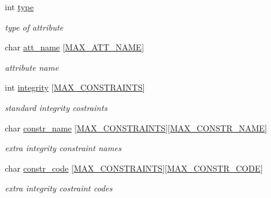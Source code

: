 \begin{DoxyCompactItemize}
\item 
\mbox{\label{structAK__header_a88b9d916b6efa4ba9408ead73ad5bd02}} 
int \hyperlink{structAK__header_a88b9d916b6efa4ba9408ead73ad5bd02}{type}
\begin{DoxyCompactList}\small\item\em type of attribute \end{DoxyCompactList}\item 
\mbox{\label{structAK__header_aa0d9f18802106957caa6661e4661d0d5}} 
char \hyperlink{structAK__header_aa0d9f18802106957caa6661e4661d0d5}{att\+\_\+name} \mbox{[}\hyperlink{constants_8h_ad221251e45ce1d6bfb3eff3b142c0fcd}{M\+A\+X\+\_\+\+A\+T\+T\+\_\+\+N\+A\+ME}\mbox{]}
\begin{DoxyCompactList}\small\item\em attribute name \end{DoxyCompactList}\item 
\mbox{\label{structAK__header_a1a420a74bf00556e0258e963e5021e28}} 
int \hyperlink{structAK__header_a1a420a74bf00556e0258e963e5021e28}{integrity} \mbox{[}\hyperlink{constants_8h_aab6cc9020398cab07c4ee0ebef5349c9}{M\+A\+X\+\_\+\+C\+O\+N\+S\+T\+R\+A\+I\+N\+TS}\mbox{]}
\begin{DoxyCompactList}\small\item\em standard integrity costraints \end{DoxyCompactList}\item 
\mbox{\label{structAK__header_aafa6aa96730559127dd491f7aef8f85c}} 
char \hyperlink{structAK__header_aafa6aa96730559127dd491f7aef8f85c}{constr\+\_\+name} \mbox{[}\hyperlink{constants_8h_aab6cc9020398cab07c4ee0ebef5349c9}{M\+A\+X\+\_\+\+C\+O\+N\+S\+T\+R\+A\+I\+N\+TS}\mbox{]}\mbox{[}\hyperlink{constants_8h_aa432633dbc4d7f4caf3b51555e421fa1}{M\+A\+X\+\_\+\+C\+O\+N\+S\+T\+R\+\_\+\+N\+A\+ME}\mbox{]}
\begin{DoxyCompactList}\small\item\em extra integrity constraint names \end{DoxyCompactList}\item 
\mbox{\label{structAK__header_af41ddb22d1a06285bc4a74d8be3d66b6}} 
char \hyperlink{structAK__header_af41ddb22d1a06285bc4a74d8be3d66b6}{constr\+\_\+code} \mbox{[}\hyperlink{constants_8h_aab6cc9020398cab07c4ee0ebef5349c9}{M\+A\+X\+\_\+\+C\+O\+N\+S\+T\+R\+A\+I\+N\+TS}\mbox{]}\mbox{[}\hyperlink{constants_8h_ab4bc2d1310c93ce94584d9648799f295}{M\+A\+X\+\_\+\+C\+O\+N\+S\+T\+R\+\_\+\+C\+O\+DE}\mbox{]}
\begin{DoxyCompactList}\small\item\em extra integrity costraint codes \end{DoxyCompactList}\end{DoxyCompactItemize}


